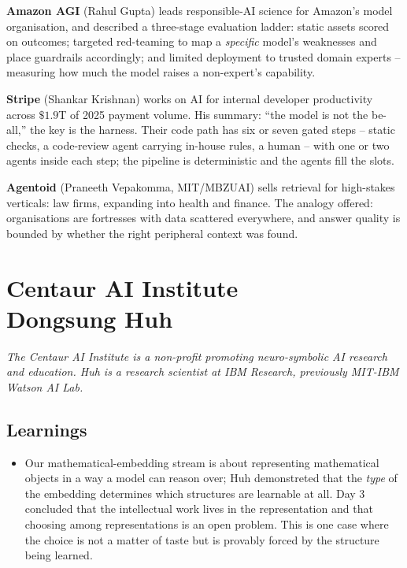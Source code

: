 \documentclass[11pt]{article}
\begin{document}
\textbf{Amazon AGI} (Rahul Gupta) leads responsible-AI science for Amazon's model organisation, and described a three-stage evaluation ladder: static assets scored on outcomes; targeted red-teaming to map a \emph{specific} model's weaknesses and place guardrails accordingly; and limited deployment to trusted domain experts -- measuring how much the model raises a non-expert's capability.

\textbf{Stripe} (Shankar Krishnan) works on AI for internal developer productivity across $\$1.9$T of 2025 payment volume. His summary: ``the model is not the be-all,'' the key is the harness. Their code path has six or seven gated steps -- static checks, a code-review agent carrying in-house rules, a human -- with one or two agents inside each step; the pipeline is deterministic and the agents fill the slots.

\textbf{Agentoid} (Praneeth Vepakomma, MIT/MBZUAI) sells retrieval for high-stakes verticals: law firms, expanding into health and finance. The analogy offered: organisations are fortresses with data scattered everywhere, and answer quality is bounded by whether the right peripheral context was found.

\section{Centaur AI Institute\\
{\large Dongsung Huh}}

\emph{The Centaur AI Institute is a non-profit promoting neuro-symbolic AI research and education. Huh is a research scientist at IBM Research, previously MIT-IBM Watson AI Lab.}

\subsection*{Learnings}
\begin{itemize}
    \item Our mathematical-embedding stream is about representing mathematical objects in a way a model can reason over; Huh demonstreted that the \emph{type} of the embedding determines which structures are learnable at all. Day 3 concluded that the intellectual work lives in the representation and that choosing among representations is an open problem. This is one case where the choice is not a matter of taste but is provably forced by the structure being learned.
\end{itemize}

\end{document}
